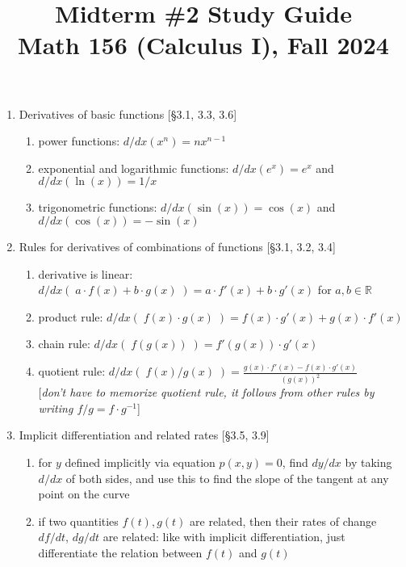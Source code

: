 \documentclass[11pt]{article}
\title{Midterm \#2 Study Guide \\ Math 156 (Calculus I), Fall 2024}
\date{}
\begin{document}
\maketitle

\thispagestyle{empty}

\vspace{-1.75cm}

\begin{enumerate}
\item Derivatives of basic functions [\S 3.1, 3.3, 3.6]
\begin{enumerate}
\item power functions: $d/dx (x^n) = n x^{n-1}$
\item exponential and logarithmic functions: $d/dx(e^x) = e^x$ and $d/dx(\ln(x)) = 1/x$
\item trigonometric functions: $d/dx(\sin(x)) = \cos(x)$ and $d/dx(\cos(x)) = -\sin(x)$
\end{enumerate}

\item Rules for derivatives of combinations of functions [\S 3.1, 3.2, 3.4]
\begin{enumerate}
\item derivative is linear: $d/dx( \; a\cdot f(x) + b\cdot g(x) \;) = a \cdot f'(x) + b \cdot g'(x)$ for $a,b \in \mathbb{R}$
\item product rule: $d/dx( \; f(x)\cdot g(x) \;) = f(x) \cdot g'(x) + g(x) \cdot f'(x)$
\item chain rule: $d/dx (\; f(g(x)) \; ) = f'(g(x)) \cdot g'(x)$
\item quotient rule: $\displaystyle d/dx (\; f(x)/g(x) \;) = \frac{g(x)\cdot f'(x) - f(x)\cdot g'(x)}{(g(x))^2}$\\ {[\emph{don't have to memorize quotient rule, it follows from other rules by writing $f/g = f\cdot g^{-1}$}]}
\end{enumerate}

\item Implicit differentiation and related rates [\S 3.5, 3.9]
\begin{enumerate}
\item for $y$ defined implicitly via equation $p(x,y)=0$, find $dy/dx$ by taking $d/dx$ of both sides, and use this to find the slope of the tangent at any point on the curve
\item if two quantities $f(t), g(t)$ are related, then their rates of change $df/dt$, $dg/dt$ are related: like with implicit differentiation, just differentiate the relation between $f(t)$ and $g(t)$
\end{enumerate}


\end{enumerate}
\end{document}
